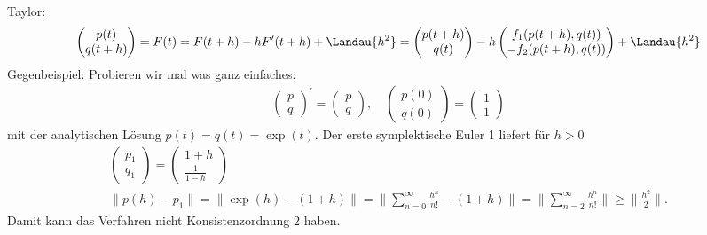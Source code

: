 \begin{solution}
Taylor:
\begin{align*}
\begin{pmatrix}
  p(t) \\ q(t+h)
\end{pmatrix} =
F(t) = F(t + h) - hF^{\prime}(t + h) + \Landau{h^2}
= \begin{pmatrix}
  p(t+h) \\ q(t)
\end{pmatrix}
- h
\begin{pmatrix}
  f_1(p(t+h),q(t)) \\ -f_2(p(t+h),q(t))
\end{pmatrix}
+ \Landau{h^2}
\end{align*}
Gegenbeispiel: Probieren wir mal was ganz einfaches:
\begin{align*}
  \begin{pmatrix}
    p \\ q
  \end{pmatrix}^{\prime}
  = \begin{pmatrix}
    p \\ q
  \end{pmatrix}, \quad
  \begin{pmatrix}
    p(0) \\ q(0)
  \end{pmatrix} =
  \begin{pmatrix}
    1 \\ 1
  \end{pmatrix}
\end{align*}
mit der analytischen Lösung $p(t) = q(t) = \exp(t)$.
Der erste symplektische Euler 1 liefert für $h > 0$
\begin{align*}
  \begin{pmatrix}
    p_1 \\ q_1
  \end{pmatrix}
  = \begin{pmatrix}
    1+h \\ \frac{1}{1-h}
  \end{pmatrix} \\
  \|p(h) - p_1\| = \|\exp(h) - (1+h)\| = \|\sum_{n = 0}^{\infty}\frac{h^n}{n!} - (1+h)\|
  = \|\sum_{n = 2}^{\infty}\frac{h^n}{n!}\| \geq \|\frac{h^2}{2}\|.
\end{align*}
Damit kann das Verfahren nicht Konsistenzordnung $2$ haben.
\end{solution}
